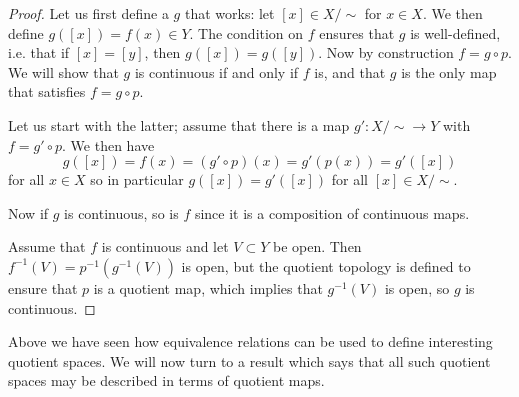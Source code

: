 \begin{proof}
  Let us first define a $g$ that works: let $[x] \in X/\!\sim$ for $x \in X$. We then define $g([x]) = f(x) \in Y$. The condition on $f$ ensures that $g$ is well-defined, i.e. that if $[x] = [y]$, then $g([x]) = g([y])$. Now by construction $f = g \circ p$. We will show that $g$ is continuous if and only if $f$ is, and that $g$ is the only map that satisfies $f = g \circ p$.
  
  Let us start with the latter; assume that there is a map $g' : X/\!\sim \to Y$ with $f = g' \circ p$. We then have
  \[
    g([x]) = f(x) = (g' \circ p)(x) = g'(p(x)) = g'([x])
  \]
  for all $x \in X$ so in particular $g([x]) = g'([x])$ for all $[x] \in X/\!\sim$.
  
  Now if $g$ is continuous, so is $f$ since it is a composition of continuous maps.
  
  Assume that $f$ is continuous and let $V \subset Y$ be open. Then $f^{-1}(V) = p^{-1}(g^{-1}(V))$ is open, but the quotient topology is defined to ensure that $p$ is a quotient map, which implies that $g^{-1}(V)$ is open, so $g$ is continuous.
\end{proof}
Above we have seen how equivalence relations can be used to define interesting quotient spaces. We will now turn to a result which says that all such quotient spaces may be described in terms of quotient maps.

